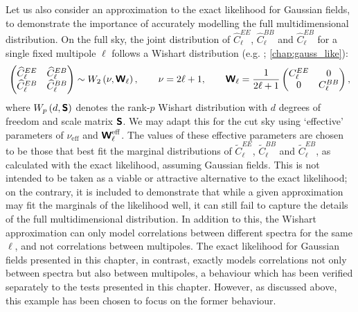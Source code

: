 Let us also consider an approximation to the exact likelihood for Gaussian fields, to demonstrate the importance of accurately modelling the full multidimensional distribution. On the full sky, the joint distribution of $\widehat{C}_\ell^{EE}$, $\widehat{C}_\ell^{BB}$ and $\widehat{C}_\ell^{EB}$ for a single fixed multipole $\ell$ follows a Wishart distribution (e.g. \citealt{Percival2006}; \autoref{chap:gauss_like}):
\begin{equation}
\begin{pmatrix}
\widehat{C}_\ell^{EE} & \widehat{C}_\ell^{EB} \\
\widehat{C}_\ell^{EB} & \widehat{C}_\ell^{BB}
\end{pmatrix}
\sim
W_2 \left( \nu, \bm{\mathsf{W}}_\ell \right),
\quad \quad
\nu = 2 \ell + 1, \quad \quad
\bm{\mathsf{W}}_\ell =
\frac{1}{2 \ell + 1}
\begin{pmatrix}
C_\ell^{EE} & 0 \\
0 & C_\ell^{BB}
\end{pmatrix},
\end{equation}
where $W_p \left( d, \bm{\mathsf{S}} \right)$ denotes the rank-$p$ Wishart distribution with $d$ degrees of freedom and scale matrix $\bm{\mathsf{S}}$. We may adapt this for the cut sky using `effective' parameters of $\nu_\mathrm{eff}$ and $\bm{\mathsf{W}}_\ell^\mathrm{eff}$. The values of these effective parameters are chosen to be those that best fit the marginal distributions of $\widetilde{C}_\ell^{EE}$, $\widetilde{C}_\ell^{BB}$ and $\widetilde{C}_\ell^{EB}$, as calculated with the exact likelihood, assuming Gaussian fields.
This is not intended to be taken as a viable or attractive alternative to the exact likelihood; on the contrary, it is included to demonstrate that while a given approximation may fit the marginals of the likelihood well, it can still fail to capture the details of the full multidimensional distribution.
In addition to this, the Wishart approximation can only model correlations between different spectra for the same $\ell$, and not correlations between multipoles. The exact likelihood for Gaussian fields presented in this chapter, in contrast, exactly models correlations not only between spectra but also between multipoles, a behaviour which has been verified separately to the tests presented in this chapter. However, as discussed above, this example has been chosen to focus on the former behaviour.

